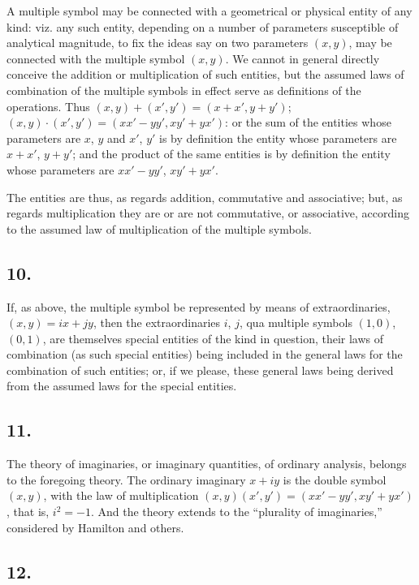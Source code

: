 \documentclass[11pt,a4paper]{book}
\begin{document}
A multiple symbol may be connected with a geometrical or physical entity of any kind: viz. any such entity, depending on a number of parameters susceptible of analytical magnitude, to fix the ideas say on two parameters $(x, y)$, may be connected with the multiple symbol $(x, y)$. We cannot in general directly conceive the addition or multiplication of such entities, but the assumed laws of combination of the multiple symbols in effect serve as definitions of the operations. Thus $(x, y) + (x', y') = (x + x', y + y')$; $(x, y) \cdot (x', y') = (xx' - yy', xy' + yx')$: or the sum of the entities whose parameters are $x$, $y$ and $x'$, $y'$ is by definition the entity whose parameters are $x + x'$, $y + y'$; and the product of the same entities is by definition the entity whose parameters are $xx' - yy'$, $xy' + yx'$.

The entities are thus, as regards addition, commutative and associative; but, as regards multiplication they are or are not commutative, or associative, according to the assumed law of multiplication of the multiple symbols.

\subsection*{10.}

If, as above, the multiple symbol be represented by means of extraordinaries, $(x, y) = ix + jy$, then the extraordinaries $i$, $j$, qua multiple symbols $(1, 0)$, $(0, 1)$, are themselves special entities of the kind in question, their laws of combination (as such special entities) being included in the general laws for the combination of such entities; or, if we please, these general laws being derived from the assumed laws for the special entities.

\subsection*{11.}

The theory of imaginaries, or imaginary quantities, of ordinary analysis, belongs to the foregoing theory. The ordinary imaginary $x + iy$ is the double symbol $(x, y)$, with the law of multiplication $(x, y)(x', y') = (xx' - yy', xy' + yx')$, that is, $i^2 = -1$. And the theory extends to the ``plurality of imaginaries,'' considered by Hamilton and others.

\subsection*{12.}
\end{document}
